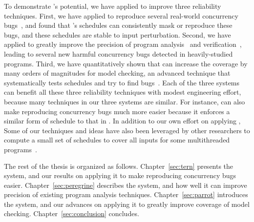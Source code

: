 
To demonstrate \smt's potential, we have applied \smt to improve three
reliability techniques. First, we have applied \tern to reproduce several
real-world concurrency bugs~\cite{cui:tern:osdi10}, and found that \smt's
schedules can consistently mask or reproduce these bugs, and these schedules are
stable to input perturbation. Second, we have applied \peregrine to greatly
improve the precision of program analysis~\cite{wu:pldi12} and
verification~\cite{wu:pldi12}, leading to several new harmful concurrency bugs
detected in heavily-studied programs. Third, we have quantitatively shown that
\parrot can increase the coverage by many orders of magnitudes for model
checking, an advanced technique that systematically tests schedules and try to
find bugs~\cite{parrot:sosp13, dbug:spin11, modist:nsdi09}. Each of the three
systems can benefit all these three reliability techniques with modest
engineering effort, because many techniques in our three \smt systems are
similar. For instance, \parrot can also make reproducing concurrency bugs much
more easier because it enforces a similar form of schedule to that in \tern. In
addition to our own effort on applying \smt, Some of our \smt techniques and
ideas have also been leveraged by other researchers to compute a small set of
schedules to cover all inputs for some multithreaded
programs~\cite{bergan:oopsla13}.

The rest of the thesis is organized as follows. Chapter~\ref{sec:tern} presents
the \tern system, and our results on applying it to make reproducing concurrency
bugs easier. Chapter~\ref{sec:peregrine} describes the \peregrine system, and
how well it can improve precision of existing program analysis techniques.
Chapter~\ref{sec:parrot} introduces the \parrot system, and our advances on
applying it to greatly improve coverage of model checking.
Chapter~\ref{sec:conclusion} concludes.



